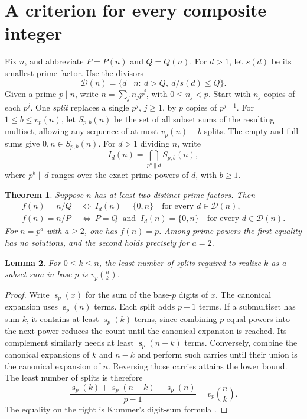 \documentclass[a4paper,11pt]{article}
\newtheorem{theorem}{Theorem}[section]
\newtheorem{lemma}[theorem]{Lemma}
\newcommand{\crit}{\mathcal D}
\newcommand{\ds}{\operatorname{s}}
\begin{document}
\section{A criterion for every composite integer}\label{sec:criterion}

Fix \(n\), and abbreviate \(P=P(n)\) and \(Q=Q(n)\). For \(d>1\), let
\(s(d)\) be its smallest prime factor. Use the divisors
\begin{equation}\label{eq:critical}
  \crit(n)=\{d\mid n:\ d>Q,\ d/s(d)\le Q\}.
\end{equation}
Given a prime \(p\mid n\), write \(n=\sum_j n_jp^j\), with
\(0\le n_j<p\). Start with \(n_j\) copies of each \(p^j\). One
\emph{split} replaces a single \(p^j\), \(j\ge1\), by \(p\) copies of
\(p^{j-1}\). For \(1\le b\le v_p(n)\), let \(S_{p,b}(n)\) be the set of
all subset sums of the resulting multiset, allowing any sequence of at most
\(v_p(n)-b\) splits. The empty and full sums give \(0,n\in S_{p,b}(n)\).
For \(d>1\) dividing \(n\), write
\[
  I_d(n)=\bigcap_{p^b\parallel d}S_{p,b}(n),
\]
where \(p^b\parallel d\) ranges over the exact prime powers of \(d\), with
\(b\ge1\).

\begin{theorem}\label{thm:criterion}
Suppose \(n\) has at least two distinct prime factors. Then
\begin{align}
 f(n)=n/Q &\ \Longleftrightarrow\
      I_d(n)=\{0,n\}\quad\text{for every }d\in\crit(n),\label{eq:Q}\\
 f(n)=n/P &\ \Longleftrightarrow\
      P=Q\ \text{ and }\ I_d(n)=\{0,n\}\quad\text{for every }d\in\crit(n).
      \label{eq:P}
\end{align}
For \(n=p^a\) with \(a\ge2\), one has \(f(n)=p\). Among prime powers the
first equality has no solutions, and the second holds precisely for \(a=2\).
\end{theorem}

\begin{lemma}\label{lem:splits}
For \(0\le k\le n\), the least number of splits required to realize \(k\)
as a subset sum in base \(p\) is \(v_p\binom nk\).
\end{lemma}

\begin{proof}
Write \(\ds_p(x)\) for the sum of the base-\(p\) digits of \(x\). The
canonical expansion uses \(\ds_p(n)\) terms. Each split adds \(p-1\) terms.
If a submultiset has sum \(k\), it contains at least \(\ds_p(k)\) terms,
since combining \(p\) equal powers into the next power reduces the count
until the canonical expansion is reached. Its complement similarly needs
at least \(\ds_p(n-k)\) terms. Conversely, combine the canonical expansions
of \(k\) and \(n-k\) and perform such carries until their union is the
canonical expansion of \(n\). Reversing those carries attains the lower
bound. The least number of splits is therefore
\begin{equation}\label{eq:kummer}
 \frac{\ds_p(k)+\ds_p(n-k)-\ds_p(n)}{p-1}=v_p\binom nk .
\end{equation}
The equality on the right is Kummer's digit-sum formula \cite{Granville}.
\end{proof}
\end{document}

